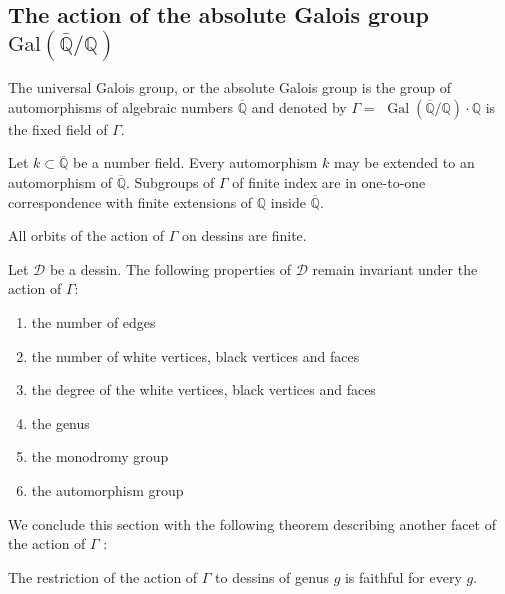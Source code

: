 \vskip5pt

\subsection{The action of the absolute Galois group 
\texorpdfstring{$\text{Gal}(\bar{\mathbb{Q}}/\mathbb{Q})$}{}}

\begin{dfn}
    The universal Galois group, or the absolute Galois group is the group of automorphisms of algebraic numbers $\overline{\mathbb{Q}}$ and denoted by $\Gamma=$ $\operatorname{Gal}(\overline{\mathbb{Q}} / \mathbb{Q}) \cdot \mathbb{Q}$ is the fixed field of $\Gamma$.
\end{dfn}

Let $k \subset \overline{\mathbb{Q}}$ be a number field. Every automorphism $k$ may be extended to an automorphism of $\overline{\mathbb{Q}}$.  Subgroups of $\Gamma$ of finite index are in one-to-one correspondence with finite extensions of $\mathbb{Q}$ inside $\overline{\mathbb{Q}}$.

\begin{rem}
    All orbits of the action of $\Gamma$ on dessins are finite.
\end{rem}

\begin{thm}
    Let $\mathcal{D}$ be a dessin. The following properties of $\mathcal{D}$ remain invariant under the action of $\Gamma$:
\begin{enumerate}
    \item the number of edges
    \item the number of white vertices, black vertices and faces
    \item the degree of the white vertices, black vertices and faces
    \item the genus
    \item the monodromy group
    \item the automorphism group
\end{enumerate}
\end{thm}

We conclude this section with the following theorem describing another facet of the action of $\Gamma$ :

\begin{thm}
    The restriction of the action of $\Gamma$ to dessins of genus $g$ is faithful for every $g$.
\end{thm}

\vskip5pt

